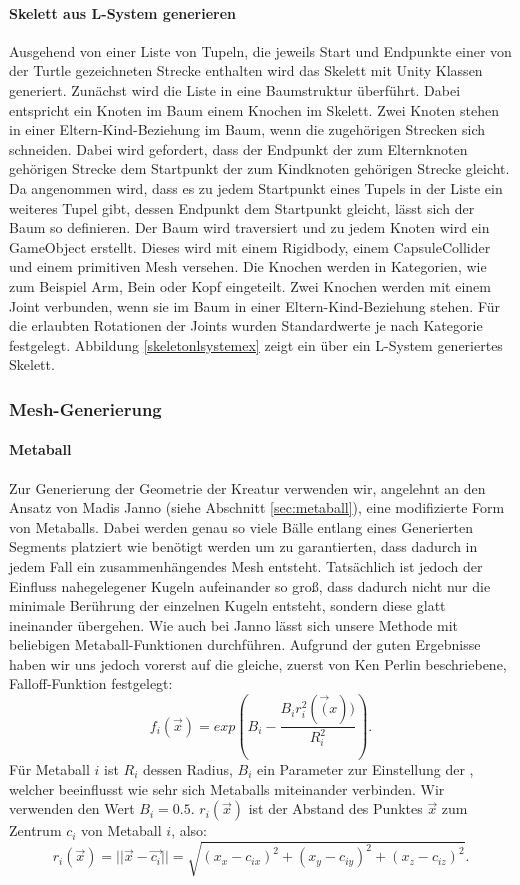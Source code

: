 \paragraph*{Skelett aus L-System generieren}\label{sec:lsystemskel}
Ausgehend von einer Liste von Tupeln, die jeweils Start und Endpunkte einer von der Turtle gezeichneten Strecke enthalten wird das Skelett mit Unity Klassen generiert. Zunächst wird die Liste in eine Baumstruktur überführt. Dabei entspricht ein Knoten im Baum einem Knochen im Skelett. Zwei Knoten stehen in einer Eltern-Kind-Beziehung im Baum, wenn die zugehörigen Strecken sich schneiden. Dabei wird gefordert, dass der Endpunkt der zum Elternknoten gehörigen Strecke dem Startpunkt der zum Kindknoten gehörigen Strecke gleicht. Da angenommen wird, dass es zu jedem Startpunkt eines Tupels in der Liste ein weiteres Tupel gibt, dessen Endpunkt dem Startpunkt gleicht, lässt sich der Baum so definieren. Der Baum wird traversiert und zu jedem Knoten wird ein GameObject erstellt.  Dieses wird mit einem Rigidbody, einem CapsuleCollider und einem primitiven Mesh versehen. Die Knochen werden in Kategorien, wie zum Beispiel Arm, Bein oder Kopf eingeteilt. Zwei Knochen werden mit einem Joint verbunden, wenn sie im Baum in einer Eltern-Kind-Beziehung stehen. Für die erlaubten Rotationen der Joints wurden Standardwerte je nach Kategorie festgelegt. Abbildung \ref{skeletonlsystemex} zeigt ein über ein L-System generiertes Skelett.



\subsubsection{Mesh-Generierung}
\paragraph{Metaball}\label{Metaball_Gen}
Zur Generierung der Geometrie der Kreatur verwenden wir, angelehnt an den Ansatz von Madis Janno \cite{Janno20182dCG} (siehe Abschnitt \ref{sec:metaball}), eine modifizierte Form von Metaballs. Dabei werden genau so viele Bälle entlang eines Generierten Segments platziert wie benötigt werden um zu garantierten, dass dadurch in jedem Fall ein zusammenhängendes Mesh entsteht. Tatsächlich ist jedoch der Einfluss nahegelegener Kugeln aufeinander so groß, dass dadurch nicht nur die minimale Berührung der einzelnen Kugeln entsteht, sondern diese glatt ineinander übergehen. Wie auch bei Janno lässt sich unsere Methode mit beliebigen Metaball-Funktionen durchführen. Aufgrund der guten Ergebnisse haben wir uns jedoch vorerst auf die gleiche, zuerst von Ken Perlin beschriebene, Falloff-Funktion festgelegt:
\[f_i(\vec{x}) = exp(B_i - \frac{B_ir_i^2(\vec(x))}{R_i^2}).\]
Für Metaball $i$ ist $R_i$ dessen Radius, $B_i$ ein Parameter zur Einstellung der \grqq{}, welcher beeinflusst wie sehr sich Metaballs miteinander verbinden. Wir verwenden den Wert $B_i = 0.5$. $r_i(\vec{x})$ ist der Abstand des Punktes $\vec{x}$ zum Zentrum $c_i$ von Metaball $i$, also: \[r_i(\vec{x})=||\vec{x}-\vec{c_i}||=\sqrt{(x_x-c_{ix})^2+(x_y-c_{iy})^2+(x_z-c_{iz})^2}.\]

